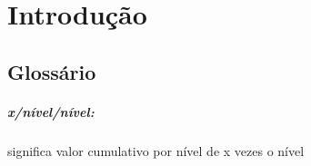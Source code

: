 \chapter{Introdução}
\section{Glossário}
\paragraph{x/nível/nível:} significa valor cumulativo por nível de x vezes o nível

 
